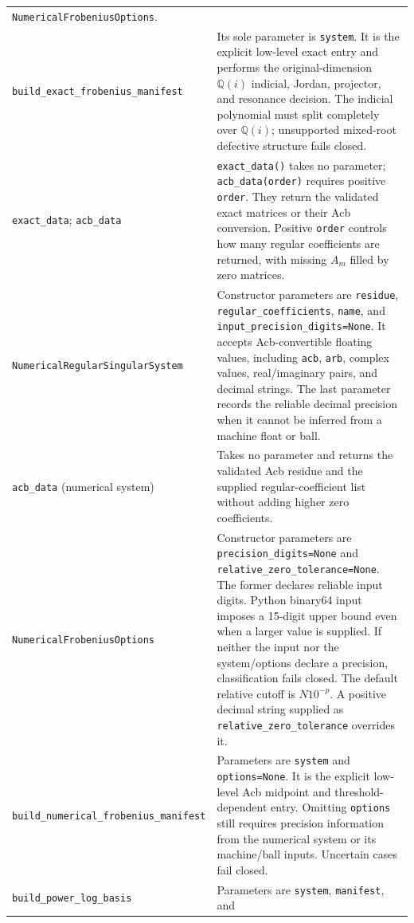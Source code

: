 \documentclass[11pt]{article}
\begin{document}
\begin{longtable}{L{0.36\textwidth}L{0.58\textwidth}}
\texttt{NumericalFrobeniusOptions}. \\
\texttt{build\_exact\_frobenius\_manifest} & Its sole parameter is \texttt{system}.  It
is the explicit low-level exact entry and performs the original-dimension $\mathbb Q(i)$
indicial, Jordan, projector, and resonance decision.  The indicial polynomial must split
completely over $\mathbb Q(i)$;
unsupported mixed-root defective structure fails closed. \\
\texttt{exact\_data}; \texttt{acb\_data} & \texttt{exact\_data()} takes no parameter;
\texttt{acb\_data(order)} requires positive \texttt{order}.  They return the
validated exact matrices or their Acb conversion.  Positive \texttt{order} controls how
many regular coefficients are returned, with missing $A_m$ filled by zero matrices. \\
\texttt{NumericalRegularSingularSystem} & Constructor parameters are \texttt{residue},
\texttt{regular\_coefficients}, \texttt{name}, and
\texttt{input\_precision\_digits=None}.  It accepts Acb-convertible floating values,
including \texttt{acb}, \texttt{arb},
complex values, real/imaginary pairs, and decimal strings.  The last parameter records the
reliable decimal precision when it cannot be inferred from a machine float or ball. \\
\texttt{acb\_data} (numerical system) & Takes no parameter and returns the validated Acb residue and
the supplied regular-coefficient list without adding higher zero coefficients. \\
\texttt{NumericalFrobeniusOptions} & Constructor parameters are
\texttt{precision\_digits=None} and \texttt{relative\_zero\_tolerance=None}.  The former
declares reliable input digits.  Python binary64 input imposes a 15-digit upper bound even
when a larger value is supplied.  If neither the input nor the system/options declare a
precision, classification fails closed.  The default relative cutoff is
$N10^{-p}$.  A positive decimal string supplied as \texttt{relative\_zero\_tolerance}
overrides it. \\
\texttt{build\_numerical\_}\newline\texttt{frobenius\_manifest} & Parameters are
\texttt{system} and
\texttt{options=None}.  It is the explicit low-level Acb midpoint and threshold-dependent
entry.  Omitting \texttt{options} still requires precision information from the numerical
system or its machine/ball inputs.  Uncertain cases fail closed. \\
\texttt{build\_power\_log\_basis} & Parameters are \texttt{system}, \texttt{manifest}, and

\end{longtable}
\end{document}
